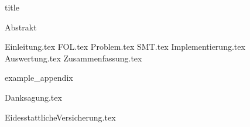 \documentclass[12pt]{scrreport}
\begin{document}
    {title}

    \frontmatter

    {Abstrakt}
    \newpage

    \tableofcontents


    \mainmatter

    {Einleitung.tex}
    {FOL.tex}
    {Problem.tex}
    {SMT.tex}
    {Implementierung.tex}
    {Auswertung.tex}
    {Zusammenfassung.tex}

    \newpage
    \printbibliography[heading = bibintoc, title = Literatur]    %

    \addappendix
    {example_appendix}
    \newpage


    \clearpage
    {Danksagung.tex}
    \newpage

    \clearpage
    \pagestyle{empty}
    {EidesstattlicheVersicherung.tex}


\end{document}
